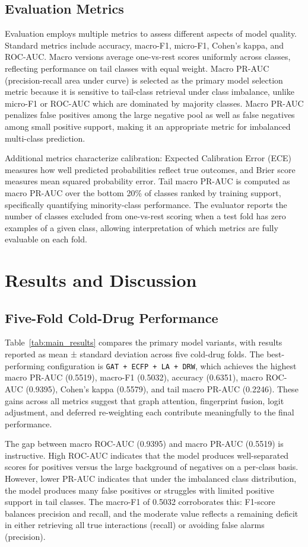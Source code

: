 \documentclass[11pt,a4paper]{report}
\begin{document}
\section{Evaluation Metrics}
Evaluation employs multiple metrics to assess different aspects of model quality. Standard metrics include accuracy, macro-F1, micro-F1, Cohen's kappa, and ROC-AUC. Macro versions average one-vs-rest scores uniformly across classes, reflecting performance on tail classes with equal weight. Macro PR-AUC (precision-recall area under curve) is selected as the primary model selection metric because it is sensitive to tail-class retrieval under class imbalance, unlike micro-F1 or ROC-AUC which are dominated by majority classes. Macro PR-AUC penalizes false positives among the large negative pool as well as false negatives among small positive support, making it an appropriate metric for imbalanced multi-class prediction.

Additional metrics characterize calibration: Expected Calibration Error (ECE) measures how well predicted probabilities reflect true outcomes, and Brier score measures mean squared probability error. Tail macro PR-AUC is computed as macro PR-AUC over the bottom 20\% of classes ranked by training support, specifically quantifying minority-class performance. The evaluator reports the number of classes excluded from one-vs-rest scoring when a test fold has zero examples of a given class, allowing interpretation of which metrics are fully evaluable on each fold.

\chapter{Results and Discussion}
\section{Five-Fold Cold-Drug Performance}
Table~\ref{tab:main_results} compares the primary model variants, with results reported as mean ± standard deviation across five cold-drug folds. The best-performing configuration is \texttt{GAT + ECFP + LA + DRW}, which achieves the highest macro PR-AUC (0.5519), macro-F1 (0.5032), accuracy (0.6351), macro ROC-AUC (0.9395), Cohen's kappa (0.5579), and tail macro PR-AUC (0.2246). These gains across all metrics suggest that graph attention, fingerprint fusion, logit adjustment, and deferred re-weighting each contribute meaningfully to the final performance.

The gap between macro ROC-AUC (0.9395) and macro PR-AUC (0.5519) is instructive. High ROC-AUC indicates that the model produces well-separated scores for positives versus the large background of negatives on a per-class basis. However, lower PR-AUC indicates that under the imbalanced class distribution, the model produces many false positives or struggles with limited positive support in tail classes. The macro-F1 of 0.5032 corroborates this: F1-score balances precision and recall, and the moderate value reflects a remaining deficit in either retrieving all true interactions (recall) or avoiding false alarms (precision).
\end{document}
